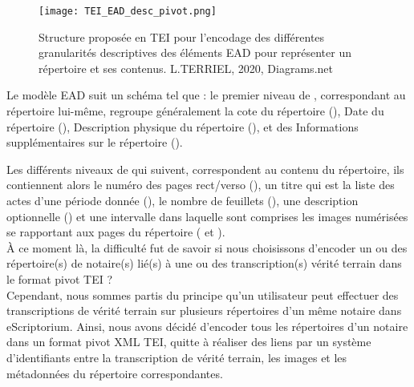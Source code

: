 \begin{figure}[h!]
  \begin{sideways}
    \texttt{[image: TEI\_EAD\_desc\_pivot.png]}
  \end{sideways}
  \centering
  \caption{Structure proposée en TEI pour l'encodage des différentes granularités descriptives des éléments EAD  pour représenter un répertoire et ses contenus. \textcopyright L.TERRIEL, 2020, Diagrams.net}
  \label{fig:TEI_EAD_desc_pivot}
\end{figure}
\clearpage

Le modèle EAD suit un schéma tel que : le premier niveau de , correspondant au répertoire lui-même, regroupe généralement la cote du répertoire (), Date du répertoire (), Description physique du répertoire (), et des Informations supplémentaires sur le répertoire (). 

Les différents niveaux de  qui suivent, correspondent au contenu du répertoire, ils contiennent alors le numéro des pages rect/verso (), un titre qui est la liste des actes d'une période donnée (), le nombre de feuillets (), une description optionnelle () et une intervalle dans laquelle sont comprises les images numérisées se rapportant aux pages du répertoire ( et ).\\

À ce moment là, la difficulté fut de savoir si nous choisissons d'encoder un ou des répertoire(s) de notaire(s) lié(s) à une ou des transcription(s) vérité terrain dans le format pivot TEI ?\\

Cependant, nous sommes partis du principe qu'un utilisateur peut effectuer des transcriptions de vérité terrain sur plusieurs répertoires d'un même notaire dans eScriptorium. Ainsi, nous avons décidé d'encoder tous les répertoires d'un notaire dans un format pivot XML TEI, quitte à réaliser des liens par un système d'identifiants entre la transcription de vérité terrain, les images et les métadonnées du répertoire correspondantes.\\

